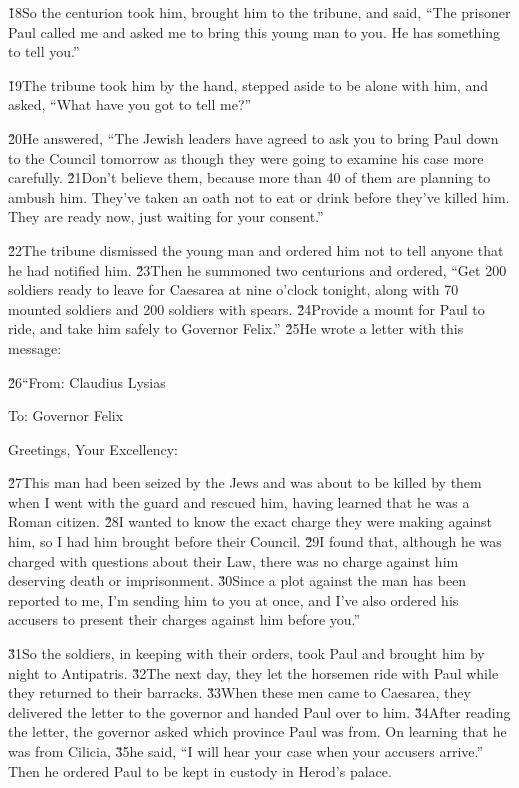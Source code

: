 \v{18}So the centurion took him, brought him to the tribune, and said, ``The prisoner Paul called me and asked me to bring this young man to you. He has something to tell you.''

\v{19}The tribune took him by the hand, stepped aside to be alone with him, and asked, ``What have you got to tell me?''

\v{20}He answered, ``The Jewish leaders have agreed to ask you to bring Paul down to the Council tomorrow as though they were going to examine his case more carefully. \v{21}Don't believe them, because more than 40 of them are planning to ambush him. They've taken an oath not to eat or drink before they've killed him. They are ready now, just waiting for your consent.''

\v{22}The tribune dismissed the young man and ordered him not to tell anyone that he had notified him. \v{23}Then he summoned two centurions and ordered, ``Get 200 soldiers ready to leave for Caesarea at nine o'clock tonight, along with 70 mounted soldiers and 200 soldiers with spears. \v{24}Provide a mount for Paul to ride, and take him safely to Governor Felix.'' \v{25}He wrote a letter with this message:

\v{26}``From: Claudius Lysias

To: Governor Felix

Greetings, Your Excellency:

\v{27}This man had been seized by the Jews and was about to be killed by them when I went with the guard and rescued him, having learned that he was a Roman citizen. \v{28}I wanted to know the exact charge they were making against him, so I had him brought before their Council. \v{29}I found that, although he was charged with questions about their Law, there was no charge against him deserving death or imprisonment. \v{30}Since a plot against the man has been reported to me, I'm sending him to you at once, and I've also ordered his accusers to present their charges against him before you.''

\v{31}So the soldiers, in keeping with their orders, took Paul and brought him by night to Antipatris. \v{32}The next day, they let the horsemen ride with Paul while they returned to their barracks. \v{33}When these men came to Caesarea, they delivered the letter to the governor and handed Paul over to him. \v{34}After reading the letter, the governor asked which province Paul was from. On learning that he was from Cilicia, \v{35}he said, ``I will hear your case when your accusers arrive.'' Then he ordered Paul to be kept in custody in Herod's palace.

